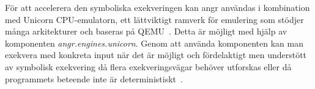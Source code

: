 För att accelerera den symboliska exekveringen kan angr användas i kombination
med Unicorn CPU-emulatorn, ett lättviktigt ramverk för emulering som stödjer
många arkitekturer och baseras på QEMU~\cite{UnicornEngine}. Detta är möjligt
med hjälp av komponenten \emph{angr.engines.unicorn}. Genom att använda
komponenten kan man exekvera med konkreta input när det är möjligt och
fördelaktigt men understött av symbolisk exekvering då flera exekveringsvägar
behöver utforskas eller då programmets beteende inte är
deterministiskt~\cite{angrUnicornEngine}.

